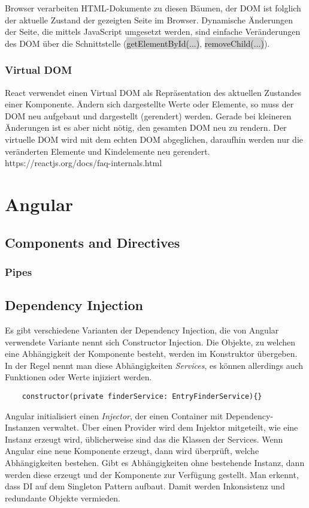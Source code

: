 Browser verarbeiten HTML-Dokumente zu diesen Bäumen, der DOM ist folglich der aktuelle Zustand der gezeigten Seite im Browser. Dynamische Änderungen der Seite, die mittels JavaScript umgesetzt werden, sind einfache Veränderungen des DOM über die Schnittstelle (\colorbox{lightgray}{getElementById(...)}, \colorbox{lightgray}{removeChild(...)}).
\subsubsection{Virtual DOM}
React verwendet einen Virtual DOM als Repräsentation des aktuellen Zustandes einer Komponente. Ändern sich dargestellte Werte oder Elemente, so muss der DOM neu aufgebaut und dargestellt (gerendert) werden. Gerade bei kleineren Änderungen ist es aber nicht nötig, den gesamten DOM neu zu rendern. Der virtuelle DOM wird mit dem echten DOM abgeglichen, daraufhin werden nur die veränderten Elemente und Kindelemente neu gerendert.
https://reactjs.org/docs/faq-internals.html

\section{Angular}
\subsection{Components and Directives}
\subsubsection{Pipes}
\subsection{Dependency Injection}
Es gibt verschiedene Varianten der Dependency Injection, die von Angular verwendete Variante nennt sich Constructor Injection. Die Objekte, zu welchen eine Abhängigkeit der Komponente besteht, werden im Konstruktor übergeben. In der Regel nennt man diese Abhängigkeiten \textit{Services}, es können allerdings auch Funktionen oder Werte injiziert werden.

\begin{verbatim}
    constructor(private finderService: EntryFinderService){}
\end{verbatim}

Angular initialisiert einen \textit{Injector}, der einen Container mit Dependency-Instanzen verwaltet. Über einen Provider wird dem Injektor mitgeteilt, wie eine Instanz erzeugt wird, üblicherweise sind das die Klassen der Services. Wenn Angular eine neue Komponente erzeugt, dann wird überprüft, welche Abhängigkeiten bestehen. Gibt es Abhängigkeiten ohne bestehende Instanz, dann werden diese erzeugt und der Komponente zur Verfügung gestellt. Man erkennt, dass DI auf dem Singleton Pattern aufbaut. Damit werden Inkonsistenz und redundante Objekte vermieden.

